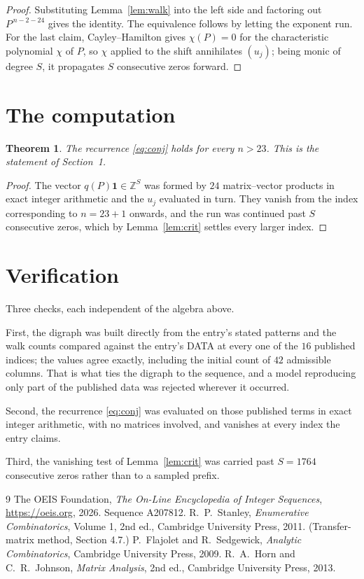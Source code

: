 \documentclass[11pt,a4paper]{article}
\theoremstyle{plain}
\newtheorem{theorem}{Theorem}
\theoremstyle{definition}
\begin{document}
\begin{proof}
Substituting Lemma~\ref{lem:walk} into the left side and factoring out
$P^{\,n-2-24}$ gives the identity. The equivalence follows by letting the exponent
run. For the last claim, Cayley--Hamilton gives $\chi(P)=0$ for the characteristic
polynomial $\chi$ of $P$, so $\chi$ applied to the shift annihilates $(u_j)$; being monic of
degree $S$, it propagates $S$ consecutive zeros forward.
\end{proof}

\section{The computation}

\begin{theorem}
The recurrence \eqref{eq:conj} holds for every $n>23$. This is the statement of
Section~1.
\end{theorem}

\begin{proof}
The vector $q(P)\mathbf{1}\in\mathbb{Z}^{S}$ was formed by $24$ matrix--vector
products in exact integer arithmetic and the $u_j$ evaluated in turn. They vanish from the
index corresponding to $n=23+1$ onwards, and the run was continued past $S$ consecutive
zeros, which by Lemma~\ref{lem:crit} settles every larger index.
\end{proof}

\section{Verification}

Three checks, each independent of the algebra above.

First, the digraph was built directly from the entry's stated patterns and the walk counts
compared against the entry's DATA at every one of the $16$ published indices; the
values agree exactly, including the initial count of $42$ admissible columns. That is
what ties the digraph to the sequence, and a model reproducing only part of the published
data was rejected wherever it occurred.

Second, the recurrence \eqref{eq:conj} was evaluated on those published terms in exact
integer arithmetic, with no matrices involved, and vanishes at every index the entry claims.

Third, the vanishing test of Lemma~\ref{lem:crit} was carried past $S=1764$ consecutive
zeros rather than to a sampled prefix.

\begin{thebibliography}{9}
 The OEIS Foundation, \emph{The On-Line Encyclopedia of Integer
Sequences}, \url{https://oeis.org}, 2026. Sequence A207812.
 R.~P.~Stanley, \emph{Enumerative Combinatorics}, Volume 1, 2nd ed.,
Cambridge University Press, 2011. (Transfer-matrix method, Section 4.7.)
 P.~Flajolet and R.~Sedgewick, \emph{Analytic Combinatorics}, Cambridge
University Press, 2009.
 R.~A.~Horn and C.~R.~Johnson, \emph{Matrix Analysis}, 2nd ed., Cambridge
University Press, 2013.
\end{thebibliography}
\end{document}
